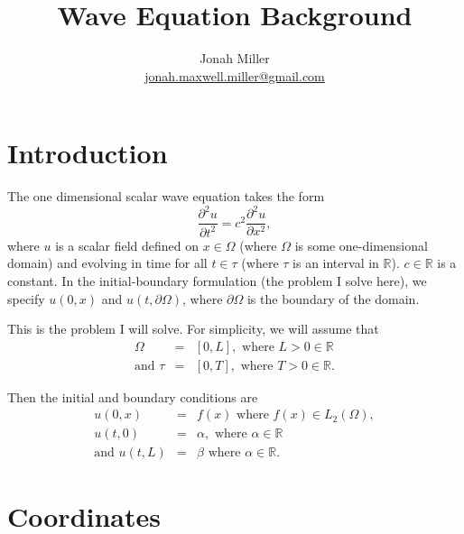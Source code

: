 \documentclass[]{article}
\author{Jonah Miller\\
  \href{mailto:jonah.maxwell.miller@gmail.com}{jonah.maxwell.miller@gmail.com}}
\title{Wave Equation Background}
\newcommand{\R}{\mathbb{R}}
\begin{document}
\maketitle

\section{Introduction}

The one dimensional scalar wave equation takes the form
\begin{equation}
  \label{eq:1d:wave}
  \frac{\partial^2 u}{\partial t^2} = c^2 \frac{\partial^2 u}{\partial x^2},
\end{equation}
where $u$ is a scalar field defined on $x\in\Omega$ (where $\Omega$ is
some one-dimensional domain) and evolving in time for all $t\in\tau$
(where $\tau$ is an interval in $\R$). $c\in\R$ is a constant. In the
initial-boundary formulation (the problem I solve here), we specify
$u(0,x)$ and $u(t,\partial\Omega)$, where $\partial\Omega$ is the
boundary of the domain.

This is the problem I will solve. For simplicity, we will assume that
\begin{eqnarray}
  \label{eq:domains}
  \Omega &=& [0,L],\text{ where }L>0\in\R\\
  \text{and }\tau &=& [0,T],\text{ where }T>0\in\R.
\end{eqnarray}

Then the initial and boundary conditions are
\begin{eqnarray}
  \label{eq:initial:boundary:data}
  u(0,x) &=& f(x)\text{ where }f(x) \in L_2(\Omega),\\
  u(t,0) &=& \alpha,\text{ where }\alpha\in\R\\
  \text{and }u(t,L)&=&\beta\text{ where }\alpha\in\R.
\end{eqnarray}

\section{Coordinates}
\end{document}
